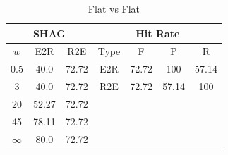 \documentclass{article}
\begin{document}

\begin{table}
 \begin{center}
   \begin{tabular}{|c|c|c||c|c|c|c|}
  \hline
  \multicolumn{3}{|c||}{\textbf{SHAG}} & \multicolumn{4}{c|}{\textbf{Hit Rate}} \\
  \hline
  $w$ & E2R    & R2E & Type & F     & P     & R \\
  \hline
  0.5       & 40.0   & 72.72   & E2R & 72.72  & 100 & 57.14 \\
  3         & 40.0   & 72.72   & R2E & 72.72  & 57.14 & 100  \\
  \cline{4-7}
  20        & 52.27  & 72.72   \\
  45        & 78.11  & 72.72   \\
  $\infty$  & 80.0   & 72.72   \\
  \cline{1-3}
 \end{tabular}
\end{center}
  \caption{Flat vs Flat}
  \label{tab:flat-flatoldmerda}
\end{table}
\end{document}
